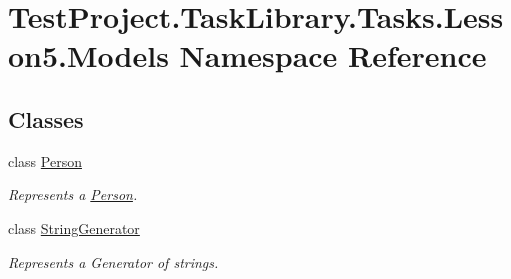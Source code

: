 \hypertarget{namespace_test_project_1_1_task_library_1_1_tasks_1_1_lesson5_1_1_models}{}\section{Test\+Project.\+Task\+Library.\+Tasks.\+Lesson5.\+Models Namespace Reference}
\label{namespace_test_project_1_1_task_library_1_1_tasks_1_1_lesson5_1_1_models}
\subsection*{Classes}
\begin{DoxyCompactItemize}
\item 
class \mbox{\hyperlink{class_test_project_1_1_task_library_1_1_tasks_1_1_lesson5_1_1_models_1_1_person}{Person}}
\begin{DoxyCompactList}\small\item\em Represents a \mbox{\hyperlink{class_test_project_1_1_task_library_1_1_tasks_1_1_lesson5_1_1_models_1_1_person}{Person}}. \end{DoxyCompactList}\item 
class \mbox{\hyperlink{class_test_project_1_1_task_library_1_1_tasks_1_1_lesson5_1_1_models_1_1_string_generator}{String\+Generator}}
\begin{DoxyCompactList}\small\item\em Represents a Generator of strings. \end{DoxyCompactList}\end{DoxyCompactItemize}
